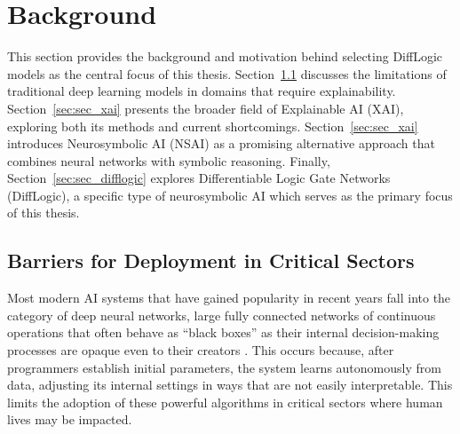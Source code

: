 
\chapter{Background}
\label{chap:background}

This section provides the background and motivation behind selecting DiffLogic models as the central focus of this thesis. Section~\ref{sec:sec_criticalsectors} discusses the limitations of traditional deep learning models in domains that require explainability. Section~\ref{sec:sec_xai} presents the broader field of Explainable AI (XAI), exploring both its methods and current shortcomings. Section~\ref{sec:sec_xai} introduces Neurosymbolic AI (NSAI) as a promising alternative approach that combines neural networks with symbolic reasoning. Finally, Section~\ref{sec:sec_difflogic} explores Differentiable Logic Gate Networks (DiffLogic), a specific type of neurosymbolic AI which serves as the primary focus of this thesis.

\section{Barriers for Deployment in Critical Sectors}
\label{sec:sec_criticalsectors}

Most modern AI systems that have gained popularity in recent years fall into the category of deep neural networks, large fully connected networks of continuous operations that often behave as ``black boxes'' as their internal decision-making processes are opaque even to their creators \cite{black_boxes}. This occurs because, after programmers establish initial parameters, the system learns autonomously from data, adjusting its internal settings in ways that are not easily interpretable. This limits the adoption of these powerful algorithms in critical sectors where human lives may be impacted. 

